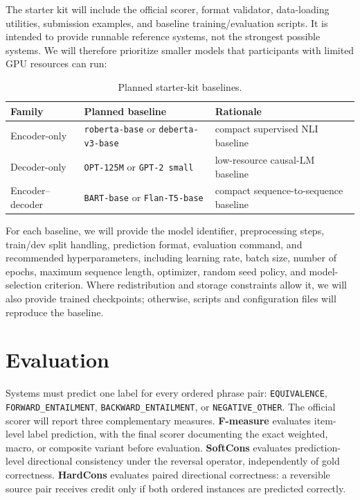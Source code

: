 \documentclass[11pt]{article}
\begin{document}
The starter kit will include the official scorer, format validator, data-loading utilities, submission examples, and baseline training/evaluation scripts.
It is intended to provide runnable reference systems, not the strongest possible systems.
We will therefore prioritize smaller models that participants with limited GPU resources can run:

\begin{table}[h]
\centering
\small
\begin{tabular}{lll}
\toprule
Family & Planned baseline & Rationale \\
\midrule
Encoder-only & \texttt{roberta-base} or \texttt{deberta-v3-base} & compact supervised NLI baseline \\
Decoder-only & \texttt{OPT-125M} or \texttt{GPT-2 small} & low-resource causal-LM baseline \\
Encoder--decoder & \texttt{BART-base} or \texttt{Flan-T5-base} & compact sequence-to-sequence baseline \\
\bottomrule
\end{tabular}
\caption{Planned starter-kit baselines.}
\label{tab:starter}
\end{table}

For each baseline, we will provide the model identifier, preprocessing steps, train/dev split handling, prediction format, evaluation command, and recommended hyperparameters, including learning rate, batch size, number of epochs, maximum sequence length, optimizer, random seed policy, and model-selection criterion.
Where redistribution and storage constraints allow it, we will also provide trained checkpoints; otherwise, scripts and configuration files will reproduce the baseline.

\section{Evaluation}

Systems must predict one label for every ordered phrase pair:
\texttt{EQUIVALENCE}, \texttt{FORWARD\_ENTAILMENT}, \texttt{BACKWARD\_ENTAILMENT}, or \texttt{NEGATIVE\_OTHER}.
The official scorer will report three complementary measures.
\textbf{F-measure} evaluates item-level label prediction, with the final scorer documenting the exact weighted, macro, or composite variant before evaluation.
\textbf{SoftCons} evaluates prediction-level directional consistency under the reversal operator, independently of gold correctness.
\textbf{HardCons} evaluates paired directional correctness: a reversible source pair receives credit only if both ordered instances are predicted correctly.
\end{document}
